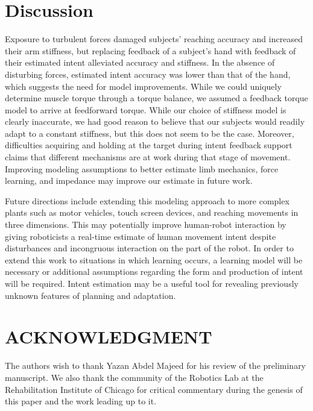 \documentclass[letterpaper, 10 pt, conference]{ieeeconf}  %
\begin{document}
\section{Discussion}
Exposure to turbulent forces damaged subjects' reaching accuracy and increased their arm stiffness, but replacing feedback of a subject's hand with feedback of their estimated intent alleviated accuracy and stiffness. In the absence of disturbing forces, estimated intent accuracy was lower than that of the hand, which suggests the need for model improvements. While we could uniquely determine muscle torque through a torque balance, we assumed a feedback torque model to arrive at feedforward torque. While our choice of stiffness model is clearly inaccurate, we had good reason to believe that our subjects would readily adapt to a constant stiffness, but this does not seem to be the case. Moreover, difficulties acquiring and holding at the target during intent feedback support claims that different mechanisms are at work during that stage of movement\cite{niu2010temporal}. Improving modeling assumptions to better estimate limb mechanics, force learning, and impedance may improve our estimate in future work.

Future directions include extending this modeling approach to more complex plants such as motor vehicles, touch screen devices, and reaching movements in three dimensions. This may potentially improve human-robot interaction by giving roboticists a real-time estimate of human movement intent despite disturbances and incongruous interaction on the part of the robot. In order to extend this work to situations in which learning occurs, a learning model will be necessary or additional assumptions regarding the form and production of intent will be required. Intent estimation may be a useful tool for revealing previously unknown features of planning and adaptation.



\section*{ACKNOWLEDGMENT}
The authors wish to thank Yazan Abdel Majeed for his review of the preliminary manuscript. We also thank the community  of the Robotics Lab at the Rehabilitation Institute of Chicago for critical commentary during the genesis of this paper and the work leading up to it.



\end{document}
